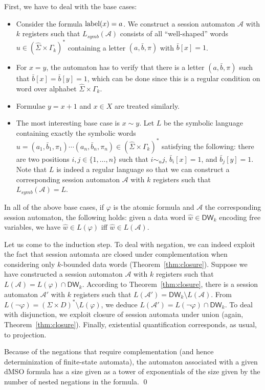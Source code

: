 \documentclass{LMCS}
\def\A{\mathcal A}
\newcommand{\symbL}{L_\mathit{symb}}
\newcommand{\Bounded}[1]{\mathsf{DW}_{#1}}
\newcommand{\mylabel}{\textup{label}}
\renewcommand{\phi}{\varphi}
\begin{document}
First, we have to deal with the base cases:
\begin{itemize}
\item Consider the formula $\mylabel(x) = a$. We
construct a session automaton $\A$ with $k$ registers such that
$\symbL(\A)$ consists of all ``well-shaped'' words $u \in
(\hat{\Sigma} \times \Gamma_k)^\ast$ containing a letter
$(a,\bar{b},\pi)$ with $\bar{b}[x] = 1$.
\item For $x = y$, the automaton has to verify that there is a letter
  $(a,\bar{b},\pi)$ such that $\bar{b}[x] = \bar{b}[y] = 1$, which can
  be done since this is a regular condition on word over alphabet
  $\hat\Sigma\times \Gamma_k$.
\item Formulae $y = x+1$ and $x \in X$ are treated similarly.
\item The most interesting base case is $x \sim y$. Let $L$ be the
  symbolic language containing exactly the symbolic words
  $u=(a_1,\bar{b}_1,\pi_1) \cdots (a_n,\bar{b}_n,\pi_n) \in
  (\hat{\Sigma} \times \Gamma_k)^\ast$ satisfying the following: there
  are two positions $i,j \in \{1,\ldots,n\}$ such that $i \sim_u j$,
  $\bar{b}_i[x] = 1$, and $\bar{b}_j[y] = 1$. Note that $L$ is indeed
  a regular language so that we can construct a corresponding session
  automaton $\A$ with $k$ registers such that $\symbL(\A)=L$.
\end{itemize}

\noindent In all of the above base cases, if $\phi$ is the atomic formula and
$\A$ the corresponding session automaton, the following holds: given a
data word $\hat w \in \Bounded{k}$ encoding free variables, we have
$\hat w \in L(\phi)$ iff $\hat w \in L(\A)$.

\smallskip
Let us come to the induction step. To deal with negation, we can
indeed exploit the fact that session automata are closed under
complementation when considering only $k$-bounded data words
(Theorem~\ref{thm:closure}). Suppose we have constructed a session
automaton $\A$ with $k$ registers such that $L(\A) = L(\phi) \cap
\Bounded{k}$.  According to Theorem~\ref{thm:closure}, there is a
session automaton $\A'$ with $k$ registers such that $L(\A') =
\Bounded{k} \setminus L(\A)$. From $L(\neg\phi)=(\Sigma\times D)^*
\setminus L(\phi)$, we deduce $L(\A') = L(\neg\phi) \cap
\Bounded{k}$. To deal with disjunction, we exploit closure of session
automata under union (again, Theorem~\ref{thm:closure}). Finally,
existential quantification corresponds, as usual, to projection. 

Because of the negations that require complementation (and hence
determinization of finite-state automata), the automaton associated
with a given dMSO formula has a size given as a tower of exponentials
of the size given by the number of nested negations in the formula. \qed
\end{document}

